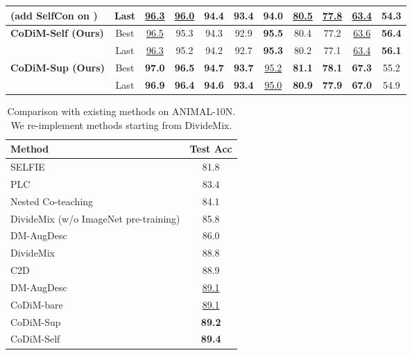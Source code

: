 \documentclass[letterpaper]{article} \usepackage{aaai22}  \usepackage{times}  \usepackage{helvet}  \usepackage{courier}  \usepackage[hyphens]{url}  \usepackage{graphicx} \usepackage{subfigure}
\begin{document}
\begin{table*}[h]
\begin{center}
\begin{tabular}{lcccccccccc}
(add SelfCon on )& Last & \underline{96.3} & \underline{96.0} & 94.4 & 93.4 & 94.0 & \underline{80.5} & \underline{77.8} & \underline{63.4} & 54.3 \\
\hline
\hline
\multirow{2}{*}{\textbf{CoDiM-Self (Ours)}} & Best & \underline{96.5} & 95.3 & 94.3 & 92.9 & \textbf{95.5} & 80.4 & 77.2 & \underline{63.6} & \textbf{56.4} \\
& Last & \underline{96.3} & 95.2 & 94.2 & 92.7 & \textbf{95.3} & 80.2 & 77.1 & \underline{63.4} & \textbf{56.1} \\
\hline
\multirow{2}{*}{\textbf{CoDiM-Sup (Ours)}} & Best & \textbf{97.0} & \textbf{96.5} & \textbf{94.7} & \textbf{93.7} & \underline{95.2} & \textbf{81.1} & \textbf{78.1} & \textbf{67.3} & 55.2 \\
 & Last & \textbf{96.9} & \textbf{96.4} & \textbf{94.6} & \textbf{93.4} & \underline{95.0} & \textbf{80.9} & \textbf{77.9} & \textbf{67.0} & 54.9 \\
\hline
\end{tabular}
\end{center}
\caption{Comparison with existing methods on CIFAR-10/100 with different noise settings. We re-implement C2D and REED here. Note CoDiM-bare can be regarded as a combination of SelfCon pre-training and then apply DM-AugDesc. CoDiM-CSSL apply SupCon on  and SelfCon on  following CSSL. Full table of results can be found in Appendix D.}
\label{tab:table2}
\end{table*}
\begin{table}[h]
\begin{center}
\begin{tabular}{lc}
\hline
Method & Test Acc \\
\hline
SELFIE \cite{song2019selfie} & 81.8 \\
PLC \cite{zhang2020learning} & 83.4 \\
Nested Co-teaching \cite{chen2021boosting} & 84.1 \\
DivideMix (w/o ImageNet pre-training) & 85.8 \\
DM-AugDesc \cite{nishi2021augmentation}& 86.0 \\
DivideMix \cite{li2020dividemix} & 88.8\\
C2D \cite{zheltonozhskii2021contrast} & 88.9\\
DM-AugDesc \cite{nishi2021augmentation}& \underline{89.1} \\
\hline
CoDiM-bare & \underline{89.1} \\
CoDiM-Sup & \textbf{89.2} \\
CoDiM-Self & \textbf{89.4} \\
\hline
\end{tabular}
\end{center}
\caption{Comparison with existing methods on ANIMAL-10N. We re-implement methods starting from DivideMix.}
\label{tab:table3}
\end{table}
\end{document}
